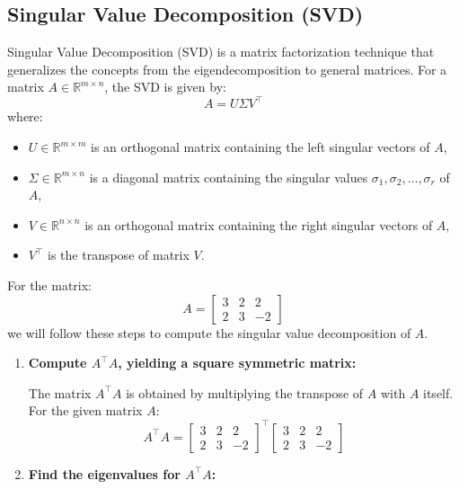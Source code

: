 \subsection{Singular Value Decomposition (SVD)}
\begin{process}
    Singular Value Decomposition (SVD) is a matrix factorization technique that generalizes the concepts from the eigendecomposition to general matrices. For a matrix \( A \in \mathbb{R}^{m \times n} \), the SVD is given by:
    \[
    A = U \Sigma V^\top
    \]
    where:
    \begin{itemize}
        \item \( U \in \mathbb{R}^{m \times m} \) is an orthogonal matrix containing the left singular vectors of \( A \),
        \item \( \Sigma \in \mathbb{R}^{m \times n} \) is a diagonal matrix containing the singular values \( \sigma_1, \sigma_2, \dots, \sigma_r \) of \( A \),
        \item \( V \in \mathbb{R}^{n \times n} \) is an orthogonal matrix containing the right singular vectors of \( A \),
        \item \( V^\top \) is the transpose of matrix \( V \).
    \end{itemize}

    For the matrix:
    \[
    A = \begin{bmatrix}
    3 & 2 & 2 \\
    2 & 3 & -2
    \end{bmatrix}
    \]
    we will follow these steps to compute the singular value decomposition of \( A \).

    \begin{enumerate}
        \item \textbf{Compute \( A^\top A \), yielding a square symmetric matrix:}
        
        The matrix \( A^\top A \) is obtained by multiplying the transpose of \( A \) with \( A \) itself. For the given matrix \( A \):
        \[
        A^\top A = \begin{bmatrix}
        3 & 2 & 2 \\
        2 & 3 & -2
        \end{bmatrix}^\top
        \begin{bmatrix}
        3 & 2 & 2 \\
        2 & 3 & -2
        \end{bmatrix}
        \]

        \item \textbf{Find the eigenvalues for \( A^\top A \):}
        

\end{enumerate}
\end{process}

